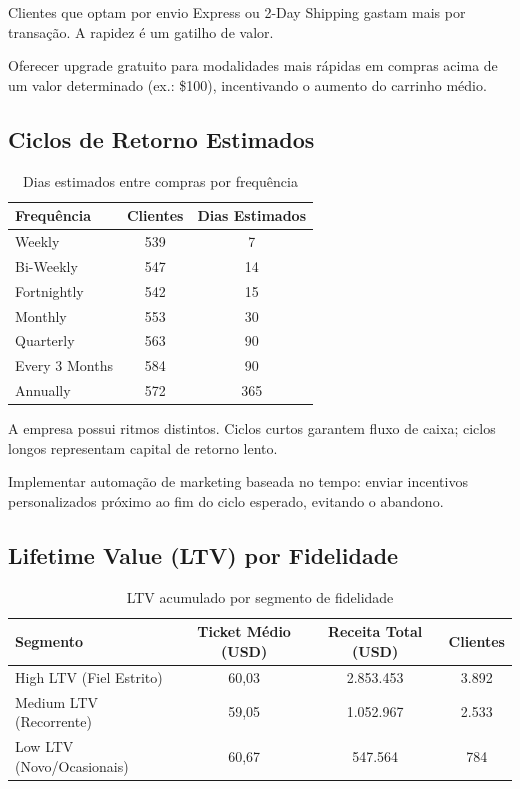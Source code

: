 \documentclass[12pt,a4paper]{article}
\begin{document}
\begin{insightbox}
Clientes que optam por envio Express ou 2-Day Shipping gastam mais por transação. A rapidez é um gatilho de valor.
\end{insightbox}
\begin{actionbox}
Oferecer upgrade gratuito para modalidades mais rápidas em compras acima de um valor determinado (ex.: \$100), incentivando o aumento do carrinho médio.
\end{actionbox}

\subsection{Ciclos de Retorno Estimados}
\begin{table}[H]
\centering
\caption{Dias estimados entre compras por frequência}
\label{tab:ciclos}
\begin{tabular}{lcc}
\toprule
\rowcolor{lightgray} \textbf{Frequência} & \textbf{Clientes} & \textbf{Dias Estimados} \\
\midrule
Weekly      & 539 & 7  \\
Bi-Weekly   & 547 & 14 \\
Fortnightly & 542 & 15 \\
Monthly     & 553 & 30 \\
Quarterly   & 563 & 90 \\
Every 3 Months & 584 & 90 \\
Annually    & 572 & 365 \\
\bottomrule
\end{tabular}
\end{table}

\begin{insightbox}
A empresa possui ritmos distintos. Ciclos curtos garantem fluxo de caixa; ciclos longos representam capital de retorno lento.
\end{insightbox}
\begin{actionbox}
Implementar automação de marketing baseada no tempo: enviar incentivos personalizados próximo ao fim do ciclo esperado, evitando o abandono.
\end{actionbox}

\subsection{Lifetime Value (LTV) por Fidelidade}
\begin{table}[H]
\centering
\caption{LTV acumulado por segmento de fidelidade}
\label{tab:ltv}
\begin{tabular}{lccc}
\toprule
\rowcolor{lightgray} \textbf{Segmento} & \textbf{Ticket Médio (USD)} & \textbf{Receita Total (USD)} & \textbf{Clientes} \\
\midrule
High LTV (Fiel Estrito)   & 60,03 & 2.853.453 & 3.892 \\
Medium LTV (Recorrente)   & 59,05 & 1.052.967 & 2.533 \\
Low LTV (Novo/Ocasionais) & 60,67 & 547.564  & 784   \\
\bottomrule
\end{tabular}
\end{table}
\end{document}
